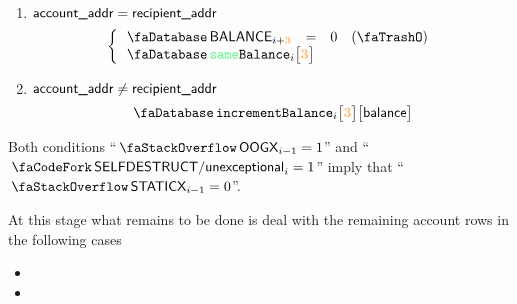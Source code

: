 \begin{description}
\begin{enumerate}
\begin{enumerate}
				        \item \If $\textsf{account\_addr} =    \textsf{recipient\_addr}$ \Then
						\[
							\left\{ \begin{array}{lclr}
								\accBalance     _{i + \locSecondAccountRow}                       & = & 0 & (\trash) \\
								\multicolumn{3}{l}{ \accSameBalance  {i}{\locSecondAccountRow}} \\
							\end{array} \right.
						\]
				        \item \If $\textsf{account\_addr} \neq \textsf{recipient\_addr}$ \Then
						\[
							\accIncrementBalance  {i}{\locSecondAccountRow}{\locBalance} \\
						\]
				\end{enumerate}
		\end{enumerate}
		\saNote{} Both conditions ``$\stackOogx_{i - 1} = 1$'' and ``$\scenSelfdestructUnexceptional_{i} = 1$'' imply that ``$\stackStaticx_{i - 1} = 0$''.
\end{description}
At this stage what remains to be done is deal with the remaining account rows in the following cases
\begin{itemize}
	\item \scenSelfdestructWillRevert{}
	\item \scenSelfdestructWontRevertNotYetMarked{}
\end{itemize}
